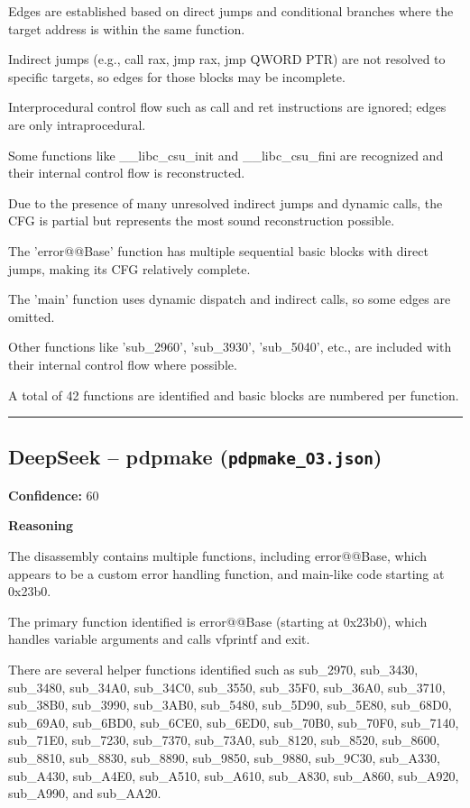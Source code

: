 Edges are established based on direct jumps and conditional branches where the target address is within the same function.

Indirect jumps (e.g., call rax, jmp rax, jmp QWORD PTR) are not resolved to specific targets, so edges for those blocks may be incomplete.

Interprocedural control flow such as call and ret instructions are ignored; edges are only intraprocedural.

Some functions like \_\_libc\_csu\_init and \_\_libc\_csu\_fini are recognized and their internal control flow is reconstructed.

Due to the presence of many unresolved indirect jumps and dynamic calls, the CFG is partial but represents the most sound reconstruction possible.

The 'error@@Base' function has multiple sequential basic blocks with direct jumps, making its CFG relatively complete.

The 'main' function uses dynamic dispatch and indirect calls, so some edges are omitted.

Other functions like 'sub\_2960', 'sub\_3930', 'sub\_5040', etc., are included with their internal control flow where possible.

A total of 42 functions are identified and basic blocks are numbered per function.

\bigskip
\hrule
\bigskip

\subsection{DeepSeek -- pdpmake (\texttt{pdpmake\_O3.json})}

\textbf{Confidence:} 60

\textbf{Reasoning}

The disassembly contains multiple functions, including error@@Base, which appears to be a custom error handling function, and main-like code starting at 0x23b0.

The primary function identified is error@@Base (starting at 0x23b0), which handles variable arguments and calls vfprintf and exit.

There are several helper functions identified such as sub\_2970, sub\_3430, sub\_3480, sub\_34A0, sub\_34C0, sub\_3550, sub\_35F0, sub\_36A0, sub\_3710, sub\_38B0, sub\_3990, sub\_3AB0, sub\_5480, sub\_5D90, sub\_5E80, sub\_68D0, sub\_69A0, sub\_6BD0, sub\_6CE0, sub\_6ED0, sub\_70B0, sub\_70F0, sub\_7140, sub\_71E0, sub\_7230, sub\_7370, sub\_73A0, sub\_8120, sub\_8520, sub\_8600, sub\_8810, sub\_8830, sub\_8890, sub\_9850, sub\_9880, sub\_9C30, sub\_A330, sub\_A430, sub\_A4E0, sub\_A510, sub\_A610, sub\_A830, sub\_A860, sub\_A920, sub\_A990, and sub\_AA20.

